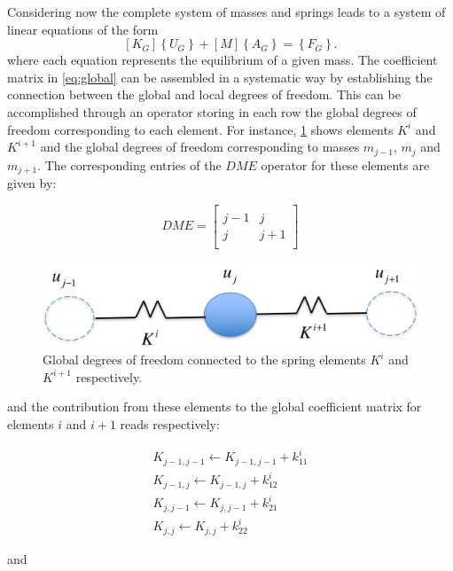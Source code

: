 Considering now the complete system of masses and springs leads to a system of linear equations of the form
\begin{equation}
\left[ {{K_G}} \right]\left\{ {{U_G}} \right\} + \left[ M \right]\left\{ {{A_G}} \right\} = \left\{ {{F_G}} \right\}.
\label{eq:global}
\end{equation}
where each equation represents the equilibrium of a given mass. The coefficient matrix in \cref{eq:global} can be assembled in a systematic way by establishing the connection between the global and local degrees of freedom. This can be accomplished through an operator storing in each row the global degrees of freedom corresponding to each element. For instance, \cref{fig:IBC} shows elements $K^i$ and $K^{i+1}$ and the global degrees of freedom corresponding to masses $m_{j-1}$, $m_j$ and $m_{j+1}$. The corresponding entries of the $DME$ operator for these elements are given by:


\[DME = \left[ {\begin{array}{*{20}{c}}
{}&{}\\
{j - 1}&j\\
j&{j + 1}\\
{}&{}
\end{array}} \right]\]

\begin{figure}[H]
\centering
\includegraphics[width=12cm]{ibc}
\caption{Global degrees of freedom connected to the spring elements $K^i$ and $K^{i+1}$ respectively.}
\label{fig:IBC}
\end{figure}

and the contribution from these elements to the global coefficient matrix for elements $i$ and $i+1$ reads respectively:


\[\begin{array}{l}
{K_{j - 1,j - 1}} \leftarrow {K_{j - 1,j - 1}} + k_{11}^i\\
{K_{j - 1,j}} \leftarrow {K_{j - 1,j}} + k_{12}^i\\
{K_{j,j - 1}} \leftarrow {K_{j,j - 1}} + k_{21}^i\\
{K_{j,j}} \leftarrow {K_{j,j}} + k_{22}^i
\end{array}\]

and


